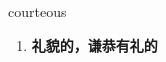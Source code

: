 
\begin{frame}
{\huge courteous}
\begin{center}
\begin{enumerate}\Large
  \item \textbf{礼貌的，谦恭有礼的}
\end{enumerate}
\end{center}
\end{frame}

